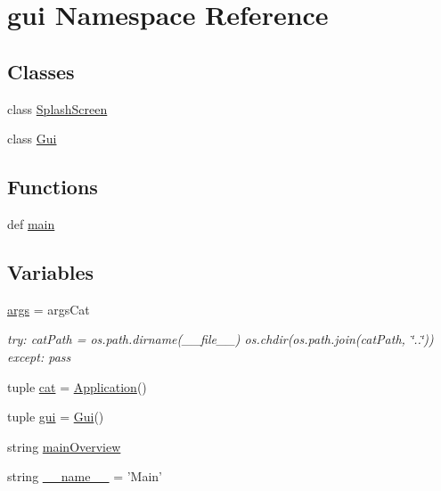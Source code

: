 \hypertarget{namespacegui}{
\section{gui Namespace Reference}
\label{namespacegui}
}
\subsection*{Classes}
\begin{DoxyCompactItemize}
\item 
class \hyperlink{classgui_1_1SplashScreen}{SplashScreen}
\item 
class \hyperlink{classgui_1_1Gui}{Gui}
\end{DoxyCompactItemize}
\subsection*{Functions}
\begin{DoxyCompactItemize}
\item 
def \hyperlink{namespacegui_a32d7eb912f06264f7e94b4d26ce2bab3}{main}
\end{DoxyCompactItemize}
\subsection*{Variables}
\begin{DoxyCompactItemize}
\item 
\hyperlink{namespacegui_a9b8a11cae23a61862fdc77e37a0398df}{args} = argsCat
\begin{DoxyCompactList}\small\item\em try: catPath = os.path.dirname(\_\-\_\-file\_\-\_\-) os.chdir(os.path.join(catPath, \char`\"{}..\char`\"{})) except: pass \item\end{DoxyCompactList}\item 
tuple \hyperlink{namespacegui_a1a4f2e71bc6439236d9608e38b757225}{cat} = \hyperlink{classApplication}{Application}()
\item 
tuple \hyperlink{namespacegui_acd337aaaca9f720eb72e04156537088f}{gui} = \hyperlink{classgui_1_1Gui}{Gui}()
\item 
string \hyperlink{namespacegui_a84cfd37f1e5cd972a2d03313f9b75628}{mainOverview}
\item 
string \hyperlink{namespacegui_ae7e8a0ad778b5c4ef10c8270a6e33d2c}{\_\-\_\-name\_\-\_\-} = 'Main'
\end{DoxyCompactItemize}


